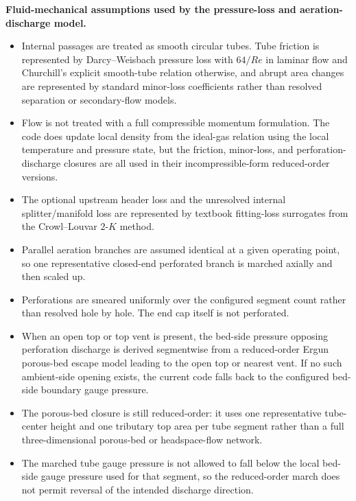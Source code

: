 \documentclass[11pt]{article}
\begin{document}
\textbf{Fluid-mechanical assumptions used by the pressure-loss and aeration-discharge model.}
\begin{itemize}[leftmargin=*]
\item Internal passages are treated as smooth circular tubes. Tube friction is represented by Darcy--Weisbach pressure loss with \(64/Re\) in laminar flow and Churchill's explicit smooth-tube relation otherwise, and abrupt area changes are represented by standard minor-loss coefficients rather than resolved separation or secondary-flow models.
\item Flow is not treated with a full compressible momentum formulation. The code does update local density from the ideal-gas relation using the local temperature and pressure state, but the friction, minor-loss, and perforation-discharge closures are all used in their incompressible-form reduced-order versions.
\item The optional upstream header loss and the unresolved internal splitter/manifold loss are represented by textbook fitting-loss surrogates from the Crowl--Louvar \(2\)-\(K\) method.
\item Parallel aeration branches are assumed identical at a given operating point, so one representative closed-end perforated branch is marched axially and then scaled up.
\item Perforations are smeared uniformly over the configured segment count rather than resolved hole by hole. The end cap itself is not perforated.
\item When an open top or top vent is present, the bed-side pressure opposing perforation discharge is derived segmentwise from a reduced-order Ergun porous-bed escape model leading to the open top or nearest vent. If no such ambient-side opening exists, the current code falls back to the configured bed-side boundary gauge pressure.
\item The porous-bed closure is still reduced-order: it uses one representative tube-center height and one tributary top area per tube segment rather than a full three-dimensional porous-bed or headspace-flow network.
\item The marched tube gauge pressure is not allowed to fall below the local bed-side gauge pressure used for that segment, so the reduced-order march does not permit reversal of the intended discharge direction.
\end{itemize}
\end{document}
